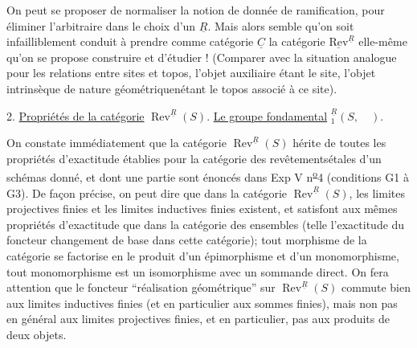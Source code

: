 On peut se proposer de normaliser la notion de donnée de ramification, pour éliminer l'arbitraire dans le choix d'un $\underline{R}$. Mais alors  semble qu'on soit infailliblement conduit à prendre comme catégorie $\underline{C}$ la catégorie $\underline{\mathrm{Rev}}^{\underline{R}}$ elle-même qu'on se propose  construire et d'étudier ! (Comparer avec la situation analogue pour les relations entre sites et topos, l'objet auxiliaire étant le site, l'objet intrinsèque de nature géométriquenétant le topos associé à ce site).

2. \uline{Propriétés de la catégorie} $\operatorname{Rev}^{\underline{R}}(S)$. \uline{Le groupe fondamental} ${}^{\underline{R}}_1(S,\quad)$.

On constate immédiatement que la catégorie $\operatorname{Rev}^{\underline{R}}(S)$ hérite de toutes les propriétés d'exactitude  établies pour la catégorie des revêtementsétales d'un schémas donné, et dont une partie sont énoncés dans Exp V n\textsuperscript{\uline{o}}4 (conditions G1 à G3). De façon précise, on peut dire que dans la catégorie $\operatorname{Rev}^{\underline{R}}(S)$, les limites projectives finies et les limites inductives finies existent, et satisfont aux mêmes propriétés d'exactitude que dans la catégorie des ensembles (telle l'exactitude du foncteur changement de base dans cette catégorie);   tout morphisme de la catégorie se factorise en le produit d'un épimorphisme et d'un monomorphisme,  tout monomorphisme est un isomorphisme avec un sommande direct. On fera attention que le foncteur ``réalisation géométrique'' sur $\operatorname{Rev}^{\underline{R}}(S)$ commute bien aux limites inductives finies (et  en particulier aux sommes finies), mais non pas en général aux limites projectives finies, et en particulier, pas aux produits de deux objets.

